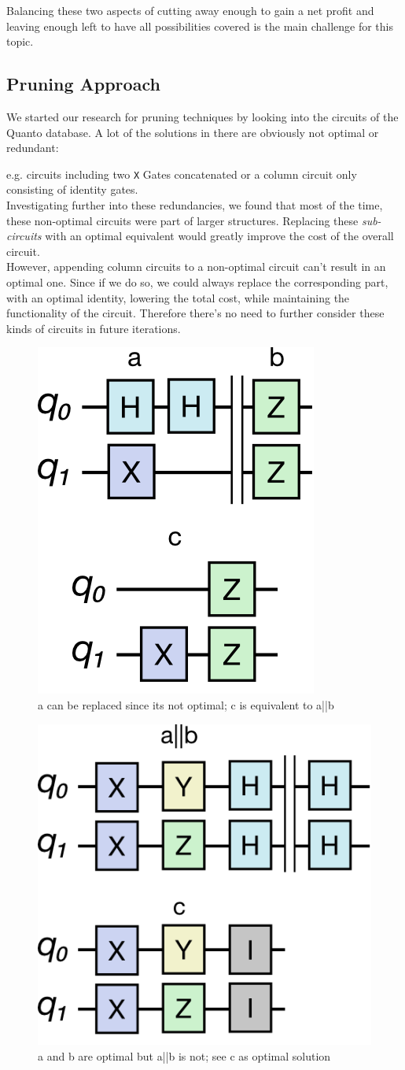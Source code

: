 Balancing these two aspects of cutting away enough to gain a net profit and leaving enough left to have all possibilities covered is the main challenge for this topic.

\subsection{Pruning Approach}
We started our research for pruning techniques by looking into the circuits of the Quanto database. A lot of the solutions in there are obviously not optimal or redundant: 

e.g. circuits including two \texttt{X} Gates concatenated or a column circuit only consisting of identity gates. \\

Investigating further into these redundancies, we found that most of the time, these non-optimal circuits were part of larger structures. Replacing these \textit{sub-circuits} with an optimal equivalent would greatly improve the cost of the overall circuit. \\

However, appending column circuits to a non-optimal circuit can't result in an optimal one. Since if we do so, we could always replace the corresponding part, with an optimal identity, lowering the total cost, while maintaining the functionality of the circuit. Therefore there's no need to further consider these kinds of circuits in future iterations.\\

\begin{figure}
	\includegraphics[width=0.4\columnwidth]{assets/approach.png}
	\caption{a can be replaced since its not optimal; c is equivalent to a||b}
	\label{fig:approach}
\end{figure}

\begin{figure}
	\includegraphics[width=0.4\columnwidth]{assets/approach-2.png}
	\caption{a and b are optimal but a||b is not; see c as optimal solution}
	\label{fig:approach}
\end{figure}

